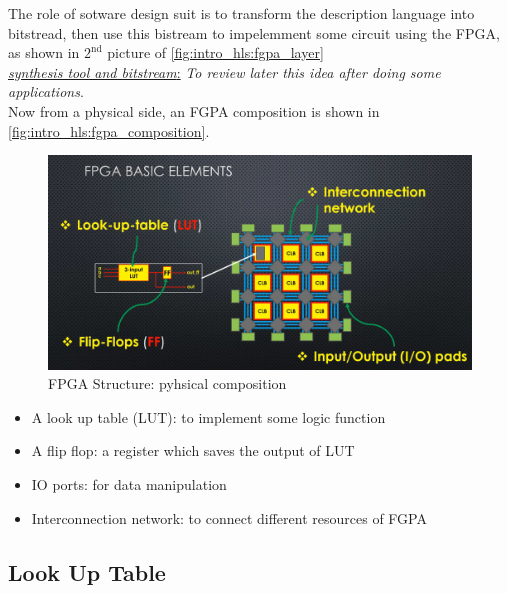 The role of sotware design suit is to transform the description language into bitstread, then use this bistream to impelemment some circuit using the FPGA, as shown in $\mathrm{2}^\mathrm{nd}$ picture of \autoref{fig:intro_hls:fgpa_layer}\\

 \underline{\textit{synthesis tool and bitstream}:} \textit{To review later this idea after doing some applications}.\\

\newpage
Now from a physical side, an FGPA composition is shown in \autoref{fig:intro_hls:fgpa_composition}.

\begin{figure}[h]
\centering
\includegraphics[scale=0.35,frame]{Figures/intro_hls/fgpa_composition}
\caption{FPGA Structure: pyhsical composition}
\label{fig:intro_hls:fgpa_composition}
\end{figure}

\begin{itemize}

\item A look up table (LUT): to implement some logic function

\item A flip flop: a register which saves the output of LUT

\item IO ports: for data manipulation

\item Interconnection network: to connect different resources of FGPA

\end{itemize}

\newpage
\subsection{Look Up Table}

